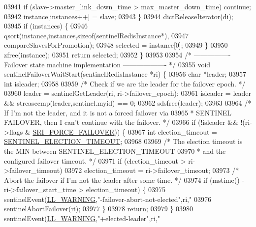 \begin{DoxyCode}
{{{{{{{{{{{{{{{{{{{{{{{{{{{{{{{{{{{{{{{{{{{{{{{{{{{{{{{{{{{{{{{{{{{{{{{{{{{{{{{{{{{{{{{03941         \textcolor{keywordflow}{if} (slave->master\_link\_down\_time > max\_master\_down\_time) \textcolor{keywordflow}{continue};
03942         instance[instances++] = slave;
03943     \}
03944     dictReleaseIterator(di);
03945     \textcolor{keywordflow}{if} (instances) \{
03946         qsort(instance,instances,\textcolor{keyword}{sizeof}(sentinelRedisInstance*),
03947             compareSlavesForPromotion);
03948         selected = instance[0];
03949     \}
03950     zfree(instance);
03951     \textcolor{keywordflow}{return} selected;
03952 \}
03953 
03954 \textcolor{comment}{/* ---------------- Failover state machine implementation ------------------- */}
03955 \textcolor{keywordtype}{void} sentinelFailoverWaitStart(sentinelRedisInstance *ri) \{
03956     \textcolor{keywordtype}{char} *leader;
03957     \textcolor{keywordtype}{int} isleader;
03958 
03959     \textcolor{comment}{/* Check if we are the leader for the failover epoch. */}
03960     leader = sentinelGetLeader(ri, ri->failover\_epoch);
03961     isleader = leader && strcasecmp(leader,sentinel.myid) == 0;
03962     sdsfree(leader);
03963 
03964     \textcolor{comment}{/* If I'm not the leader, and it is not a forced failover via}
03965 \textcolor{comment}{     * SENTINEL FAILOVER, then I can't continue with the failover. */}
03966     \textcolor{keywordflow}{if} (!isleader && !(ri->flags & \hyperlink{sentinel_8c_a9b13a255852e8097e4730cb495cdfd94}{SRI\_FORCE\_FAILOVER})) \{
03967         \textcolor{keywordtype}{int} election\_timeout = \hyperlink{sentinel_8c_ac6683124f6ae873093919c7eb840ec94}{SENTINEL\_ELECTION\_TIMEOUT};
03968 
03969         \textcolor{comment}{/* The election timeout is the MIN between SENTINEL\_ELECTION\_TIMEOUT}
03970 \textcolor{comment}{         * and the configured failover timeout. */}
03971         \textcolor{keywordflow}{if} (election\_timeout > ri->failover\_timeout)
03972             election\_timeout = ri->failover\_timeout;
03973         \textcolor{comment}{/* Abort the failover if I'm not the leader after some time. */}
03974         \textcolor{keywordflow}{if} (mstime() - ri->failover\_start\_time > election\_timeout) \{
03975             sentinelEvent(\hyperlink{server_8h_a31229b9334bba7d6be2a72970967a14b}{LL\_WARNING},\textcolor{stringliteral}{"-failover-abort-not-elected"},ri,\textcolor{stringliteral}{"%
03976             sentinelAbortFailover(ri);
03977         \}
03978         \textcolor{keywordflow}{return};
03979     \}
03980     sentinelEvent(\hyperlink{server_8h_a31229b9334bba7d6be2a72970967a14b}{LL\_WARNING},\textcolor{stringliteral}{"+elected-leader"},ri,\textcolor{stringliteral}{"%
}}}}}}}}}}}}}}}}}}}}}}}}}}}}}}}}}}}}}}}}}}}}}}}}}}}}}}}}}}}}}}}}}}}}}}}}}}}}}}}}}}}}}}}}}
\end{DoxyCode}

